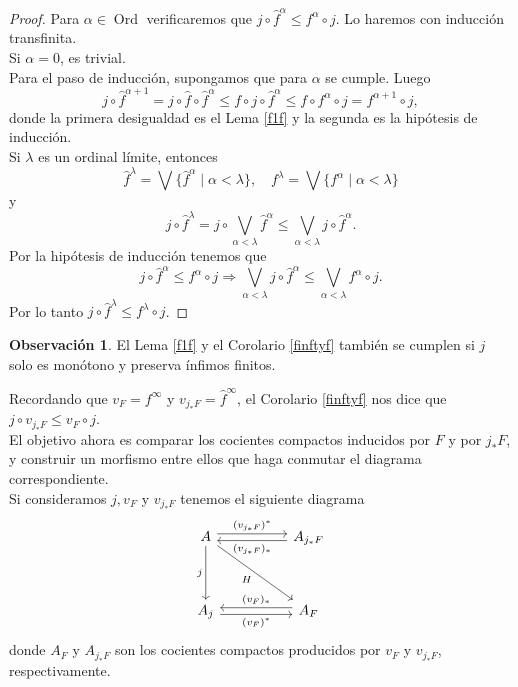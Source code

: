 \documentclass[11pt]{amsart}
\DeclareMathOperator{\Ord}{Ord}
\theoremstyle{plain}
\theoremstyle{definition}
\newtheorem{obs}[thm]{Observación}
\begin{document}
\begin{proof}
    Para $\alpha\in \Ord$ verificaremos que $j\circ \hat{f}^\alpha\leq f^\alpha\circ j$. Lo haremos con inducción transfinita.\\

    Si $\alpha=0$, es trivial.\\

    Para el paso de inducción, supongamos que para $\alpha$ se cumple. Luego
    \[
    j\circ \hat{f}^{\alpha+1}=j\circ \hat{f}\circ \hat{f}^{\alpha}\leq  f\circ j\circ \hat{f}^\alpha\leq f\circ f^\alpha\circ j=f^{\alpha+1}\circ j,
    \]
    donde la primera desigualdad es el Lema \ref{f1f} y la segunda es la hipótesis de inducción.\\

    Si $\lambda$ es un ordinal límite, entonces
	\[
	\hat{f}^\lambda=\bigvee\{\hat{f}^\alpha\mid \alpha<\lambda\}, \quad f^\lambda=\bigvee\{f^\alpha\mid \alpha<\lambda\} 
	\]
	y
	\[
		j\circ \hat{f}^\lambda=j\circ \bigvee_{\alpha<\lambda}\hat{f}^\alpha\leq\bigvee_{\alpha<\lambda}j\circ \hat{f}^\alpha.
	\]
	Por la hipótesis de inducción tenemos que 
	\[
	j\circ \hat{f}^\alpha\leq f^\alpha\circ j\Rightarrow \bigvee_{\alpha<\lambda}j\circ \hat{f}^\alpha\leq \bigvee_{\alpha<\lambda} f^\alpha\circ j.
	\]
	Por lo tanto $j\circ \hat{f}^\lambda\leq f^\lambda\circ j$.
\end{proof}

\begin{obs}\label{j monotono}
El Lema \ref{f1f} y el Corolario \ref{finftyf} también se cumplen si $j$ solo es monótono y preserva ínfimos finitos.
\end{obs}

Recordando que $v_F=f^\infty$ y $v_{j_*F}=\hat{f}^\infty$, el Corolario \ref{finftyf} nos dice que $j\circ v_{j_*F}\leq v_F\circ j$.\\

El objetivo ahora es comparar los cocientes compactos inducidos por $F$ y por $j_*F$, y construir un morfismo entre ellos que haga conmutar el diagrama correspondiente.\\

Si consideramos $j, v_F$ y $v_{j_*F}$ tenemos el siguiente diagrama
\begin{equation}\label{diagrama H}
    \begin{tikzcd}
	A && {A_{j_*F}} \\
	\\
	{A_j} && {A_F}
	\arrow["{(v_{j_*F})^*}", shift left, from=1-1, to=1-3]
	\arrow["j"', from=1-1, to=3-1]
	\arrow["H"', from=1-1, to=3-3]
	\arrow["{(v_{j_*F})_*}", shift left, from=1-3, to=1-1]
	\arrow["{(v_F)^*}"', shift right, from=3-1, to=3-3]
	\arrow["{(v_F)_*}"', shift right, from=3-3, to=3-1]
\end{tikzcd}
\end{equation}
donde $A_F$ y $A_{j_*F}$ son los cocientes compactos producidos por $v_F$ y $v_{j_*F}$, respectivamente.\\
\end{document}
